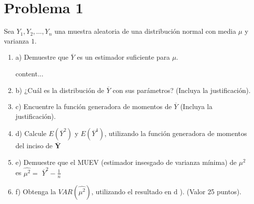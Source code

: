 \section{Problema 1}


Sea $Y_{1}, Y_{2}, \ldots, Y_{n}$ una muestra aleatoria de una distribución normal con media $\mu$ y varianza $1 .$
\begin{enumerate}
	\item a) Demuestre que $\overline{Y}$ es un estimador suficiente para $\mu$.
	\begin{solution}
		content...
	\end{solution}
	\item b) ¿Cuál es la distribución de $\overline{Y}$ con sus parámetros? (Incluya la justificación).
	\item c) Encuentre la función generadora de momentos de $\overline{Y}$ (Incluya la justificación).
	\item d) Calcule $E\left(\overline{Y}^{2}\right)$ y $E\left(\overline{Y}^{4}\right)$, utilizando la función generadora de momentos del inciso de
	$\overline{\boldsymbol{Y}}$
    \item e) Demuestre que el MUEV (estimador insesgado de varianza mínima) de $\mu^{2}$ es $\widehat{\mu^{2}}=$ $\overline{Y}^{2}-\frac{1}{n}$
	\item f) Obtenga la $V A R\left(\widehat{\mu^{2}}\right)$, utilizando el resultado en $\mathrm{d}$ ). (Valor 25 puntos).
\end{enumerate}


